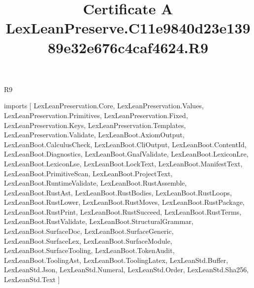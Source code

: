 \begin{lexlean}{R9}
\title{Certificate A LexLeanPreserve.C11e9840d23e13989e32e676c4caf4624.R9}
\begin{coremodule}
imports [
  LexLeanPreservation.Core,
  LexLeanPreservation.Values,
  LexLeanPreservation.Primitives,
  LexLeanPreservation.Fixed,
  LexLeanPreservation.Keys,
  LexLeanPreservation.Templates,
  LexLeanPreservation.Validate,
  LexLeanBoot.AxiomOutput,
  LexLeanBoot.CalculusCheck,
  LexLeanBoot.CliOutput,
  LexLeanBoot.ContentId,
  LexLeanBoot.Diagnostics,
  LexLeanBoot.GnafValidate,
  LexLeanBoot.LexiconLre,
  LexLeanBoot.LexiconLse,
  LexLeanBoot.LockText,
  LexLeanBoot.ManifestText,
  LexLeanBoot.PrimitiveScan,
  LexLeanBoot.ProjectText,
  LexLeanBoot.RuntimeValidate,
  LexLeanBoot.RustAssemble,
  LexLeanBoot.RustAst,
  LexLeanBoot.RustBodies,
  LexLeanBoot.RustLoops,
  LexLeanBoot.RustLower,
  LexLeanBoot.RustMoves,
  LexLeanBoot.RustPackage,
  LexLeanBoot.RustPrint,
  LexLeanBoot.RustSucceed,
  LexLeanBoot.RustTerms,
  LexLeanBoot.RustValidate,
  LexLeanBoot.StructuralGrammar,
  LexLeanBoot.SurfaceDoc,
  LexLeanBoot.SurfaceGeneric,
  LexLeanBoot.SurfaceLex,
  LexLeanBoot.SurfaceModule,
  LexLeanBoot.SurfaceTooling,
  LexLeanBoot.TokenAudit,
  LexLeanBoot.ToolingAst,
  LexLeanBoot.ToolingLatex,
  LexLeanStd.Buffer,
  LexLeanStd.Json,
  LexLeanStd.Numeral,
  LexLeanStd.Order,
  LexLeanStd.Sha256,
  LexLeanStd.Text
]


\end{coremodule}
\end{lexlean}
